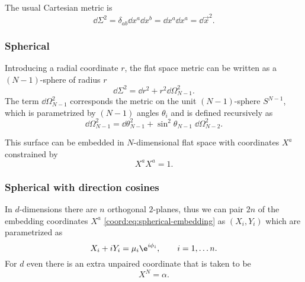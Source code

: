 The usual Cartesian metric is
\begin{equation}
	\dd \Sigma^2 = \delta_{ab} \dd x^a \dd x^b
		= \dd x^a \dd x^a
		= \dd \vec x^2.
\end{equation} 


\subsubsection{Spherical}


Introducing a radial coordinate $r$, the flat space metric can be written as a $(N-1)$-sphere of radius $r$
\begin{equation}
	\label{coord:metric:flat-d:spherical}
	\dd \Sigma^2 = \dd r^2 + r^2 \dd \Omega_{N-1}^2.
\end{equation} 
The term $\dd \Omega_{N-1}^2$ corresponds the metric on the unit $(N-1)$-sphere $S^{N-1}$, which is parame\-trized by $(N-1)$ angles $\theta_i$ and is defined recursively as
\begin{equation}
	\dd \Omega_{N-1}^2 = \dd \theta_{N-1}^2 + \sin^2 \theta_{N-1} \; \dd \Omega_{N-2}^2.
\end{equation} 

This surface can be embedded in $N$-dimensional flat space with coordinates $X^a$ constrained by
\begin{equation}
	\label{coord:eq:spherical-embedding}
	X^a X^a = 1.
\end{equation} 


\subsubsection{Spherical with direction cosines}


In $d$-dimensions there are $n$ orthogonal $2$-planes,\footnotemark{} thus we can pair $2n$ of the embedding coordinates $X^a$ \eqref{coord:eq:spherical-embedding} as $(X_i, Y_i)$ which are parametrized as%
\begin{equation}
	X_i + i Y_i = \mu_i \e^{i\phi_i}, \qquad
	i = 1, \ldots n.
\end{equation} 
For $d$ even there is an extra unpaired coordinate that is taken to be
\begin{equation}
	X^N = \alpha.
\end{equation}

